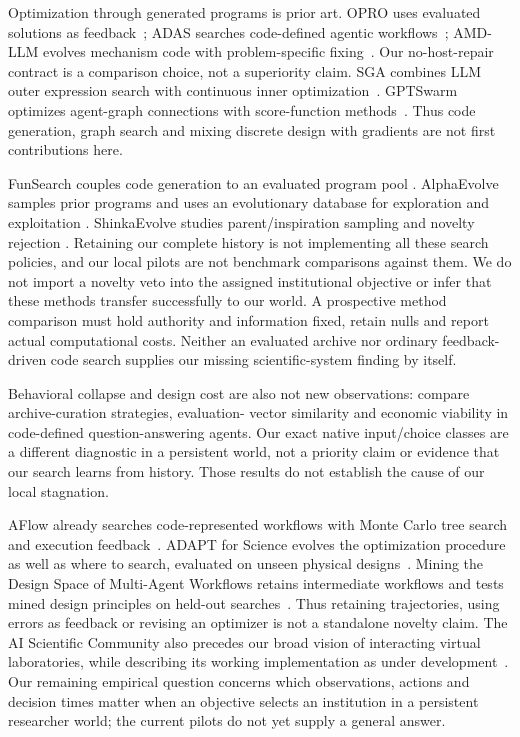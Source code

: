 Optimization through generated programs is prior art. OPRO uses evaluated
solutions as feedback~\citep{yang2024opro}; ADAS searches code-defined agentic
workflows~\citep{hu2024adas}; AMD-LLM evolves mechanism code with problem-specific
fixing~\citep{liu2025mechanism}. Our no-host-repair contract is a comparison
choice, not a superiority claim. SGA combines LLM outer expression search with
continuous inner optimization~\citep{ma2024sga}. GPTSwarm optimizes agent-graph
connections with score-function methods~\citep{zhuge2024gptswarm}. Thus code
generation, graph search and mixing discrete design with gradients are not
first contributions here.

FunSearch couples code generation to an evaluated program pool
\citep{romeraparedes2023funsearch}. AlphaEvolve samples prior programs and uses
an evolutionary database for exploration and exploitation
\citep{novikov2025alphaevolve}. ShinkaEvolve studies parent/inspiration sampling
and novelty rejection \citep{lange2025shinkaevolve}. Retaining our complete
history is not implementing all these search policies, and our local pilots
are not benchmark comparisons against them. We do not import a novelty veto
into the assigned institutional objective or infer that these methods transfer
successfully to our world. A prospective method comparison must hold authority
and information fixed, retain nulls and report actual computational costs.
Neither an evaluated archive nor ordinary feedback-driven code search supplies
our missing scientific-system finding by itself.

Behavioral collapse and design cost are also not new observations:
\citet{el2025inefficiencies} compare archive-curation strategies, evaluation-
vector similarity and economic viability in code-defined question-answering
agents. Our exact native input/choice classes are a different diagnostic in
a persistent world, not a priority claim or evidence that our search learns
from history. Those results do not establish the cause of our local stagnation.

AFlow already searches code-represented workflows with Monte Carlo tree
search and execution feedback~\citep{zhang2024aflow}. ADAPT for Science evolves
the optimization procedure as well as where to search, evaluated on unseen
physical designs~\citep{feng2026adapt}. Mining the Design Space of Multi-Agent
Workflows retains intermediate workflows and tests mined design principles
on held-out searches~\citep{cadet2026mining}. Thus retaining trajectories,
using errors as feedback or revising an optimizer is not a standalone novelty
claim. The AI Scientific Community also precedes our broad vision of
interacting virtual laboratories, while describing its working implementation
as under development~\citep{braganeto2026community}. Our remaining empirical
question concerns which observations, actions and decision times matter when
an objective selects an institution in a persistent researcher world; the
current pilots do not yet supply a general answer.

